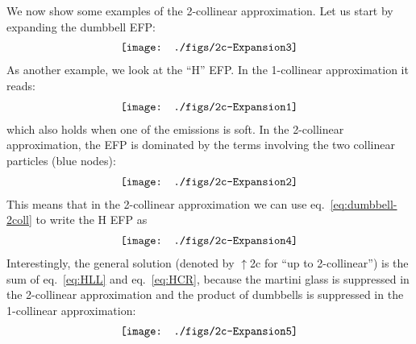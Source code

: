 \documentclass[a4paper,11pt]{article}
\newcommand{\eq}[1]{eq.~\eqref{eq:#1}}
\begin{document}
We now show some examples of the 2-collinear approximation. Let us start by expanding the dumbbell EFP:
\begin{align}
 \texttt{[image: ./figs/2c-Expansion3]} \raisetag{1.4\baselineskip}    
 \label{eq:dumbbell-2coll}
\end{align}
As another example, we look at the ``H'' EFP.  In the 1-collinear approximation it reads:
\begin{align} \label{eq:HLL}
 \texttt{[image: ./figs/2c-Expansion1]} \raisetag{1.9\baselineskip}    
\end{align}
which also holds when one of the emissions is soft.
In the 2-collinear approximation, the EFP is dominated by the terms involving the two collinear particles (blue nodes):
\begin{align}
 \texttt{[image: ./figs/2c-Expansion2]} \raisetag{1.2\baselineskip}    
\end{align}
This means that in the 2-collinear approximation we can use \eq{dumbbell-2coll} to write the H EFP as
\begin{align} \label{eq:HCR}
 \texttt{[image: ./figs/2c-Expansion4]} \raisetag{2.0\baselineskip}    
\end{align}
Interestingly, the general solution (denoted by $\uparrow$2c for ``up to 2-collinear'') is the sum of \eq{HLL} and \eq{HCR}, because the martini glass is suppressed in the 2-collinear approximation and the product of dumbbells is suppressed in the 1-collinear approximation:
\begin{align} \label{eq:HNLL}
 \texttt{[image: ./figs/2c-Expansion5]} \raisetag{2.0\baselineskip}    
\end{align}
\end{document}
